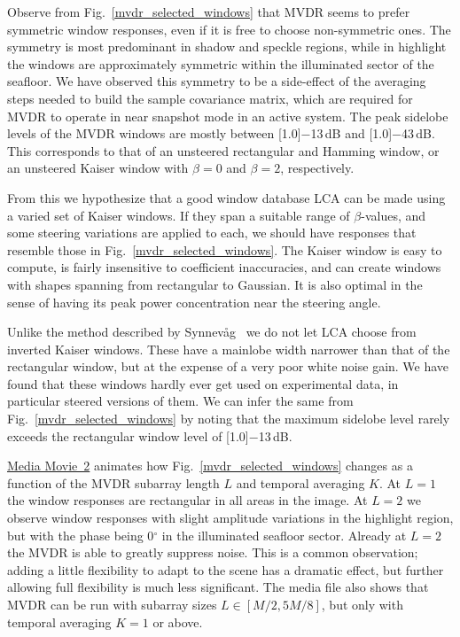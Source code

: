 \documentclass[10pt,journal,draftclsnofoot,onecolumn]{IEEEtran}
\newcommand\Fig[1]{Fig.~\ref{#1}}
\newcommand\1{\vec 1}
\newcommand\minus{\scalebox{0.75}[1.0]{$-$}}
\newcommand\multimedia[2]{\href{#1}{#2}}
\newcommand\mediaPath{http://folk.uio.no/joibu/media/2015_JOE_LCA}
\newcommand\mediaII{\multimedia{\mediaPath/media2.mp4}{Media Movie~2}}
\begin{document}
Observe from \Fig{mvdr_selected_windows} that MVDR seems to prefer symmetric window responses, even if it is free to choose non-symmetric ones. The symmetry is most predominant in shadow and speckle regions, while in highlight the windows are approximately symmetric within the illuminated sector of the seafloor. We have observed this symmetry to be a side-effect of the averaging steps needed to build the sample covariance matrix, which are required for MVDR to operate in near snapshot mode in an active system. The peak sidelobe levels of the MVDR windows are mostly between \minus{}13\,dB and \minus{}43\,dB. This corresponds to that of an unsteered rectangular and Hamming window, or an unsteered Kaiser window with $\beta=0$ and $\beta=2$, respectively.

From this we hypothesize that a good window database LCA can be made using a varied  set of Kaiser windows. If they span a suitable range of $\beta$-values, and some steering variations are applied to each, we should have responses that resemble those in \Fig{mvdr_selected_windows}. The Kaiser window is easy to compute, is fairly insensitive to coefficient inaccuracies, and can create windows with shapes spanning from rectangular to Gaussian. It is also optimal in the sense of having its peak power concentration near the steering angle.

Unlike the method described by Synnev\aa{}g~\cite{Synnevag2008} we do not let LCA choose from inverted Kaiser windows. These have a mainlobe width narrower than that of the rectangular window, but at the expense of a very poor white noise gain. We have found that these windows hardly ever get used on experimental data, in particular steered versions of them. We can infer the same from \Fig{mvdr_selected_windows} by noting that the maximum sidelobe level rarely exceeds the rectangular window level of \minus{}13\,dB.

\mediaII{} animates how \Fig{mvdr_selected_windows} changes as a function of the MVDR subarray length $L$ and temporal averaging $K$. At $L=1$ the window responses are rectangular in all areas in the image. At $L=2$ we observe window responses with slight amplitude variations in the highlight region, but with the phase being 0$^\circ$ in the illuminated seafloor sector. Already at $L=2$ the MVDR is able to greatly suppress noise. This is a common observation; adding a little flexibility to adapt to the scene has a dramatic effect, but further allowing full flexibility is much less significant. The media file also shows that MVDR can be run with subarray sizes $L\in[M/2,5M/8]$, but only with temporal averaging $K=1$ or above.
\end{document}
